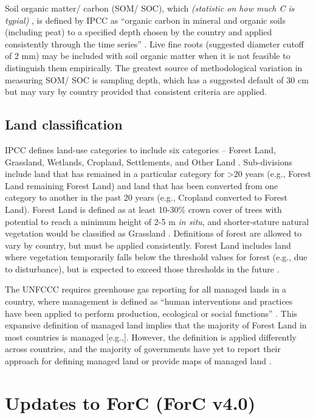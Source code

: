 \documentclass[, manuscript]{copernicus}
\begin{document}
Soil organic matter/ carbon (SOM/ SOC), which \emph{(statistic on how
much C is typial)} \citep{ref}, is defined by IPCC as ``organic carbon
in mineral and organic soils (including peat) to a specified depth
chosen by the country and applied consistently through the time series''
\citep{ipcc_good_2003, ipcc_2006_2006}. Live fine roots (suggested
diameter cutoff of 2 mm) may be included with soil organic matter when
it is not feasible to distinguish them empirically. The greatest source
of methodological variation in measuring SOM/ SOC is sampling depth,
which has a suggested default of 30 cm but may vary by country provided
that consistent criteria are applied.

\subsection{Land classification}

IPCC defines land-use categories to include six categories -- Forest
Land, Grassland, Wetlands, Cropland, Settlements, and Other Land
\citep{ipcc_2006_2006}. Sub-divisions include land that has remained in
a particular category for \textgreater20 years (e.g., Forest Land
remaining Forest Land) and land that has been converted from one
category to another in the past 20 years (e.g., Cropland converted to
Forest Land). Forest Land is defined as at least 10-30\% crown cover of
trees with potential to reach a minimum height of 2-5 m \emph{in situ},
and shorter-stature natural vegetation would be classified as Grassland
\citep{ipcc_good_2003}. Definitions of forest are allowed to vary by
country, but must be applied consistently. Forest Land includes land
where vegetation temporarily falls below the threshold values for forest
(e.g., due to disturbance), but is expected to exceed those thresholds
in the future \citep{ipcc_good_2003}.

The UNFCCC requires greenhouse gas reporting for all managed lands in a
country, where management is defined as ``human interventions and
practices have been applied to perform production, ecological or social
functions'' \citep{ipcc_2006_2006}. This expansive definition of managed
land implies that the majority of Forest Land in most countries is
managed {[}e.g.,{]}. However, the definition is applied differently
across countries, and the majority of governments have yet to report
their approach for defining managed land or provide maps of managed land
\citep{ogle_delineating_2018, deng_comparing_2021}.

\section{Updates to ForC (ForC v4.0)}
\end{document}

